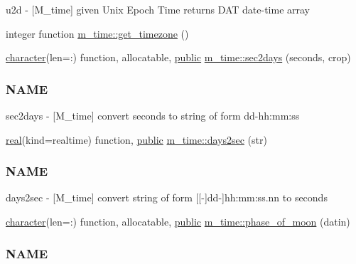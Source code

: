 \begin{DoxyCompactItemize}
\begin{DoxyCompactList}
u2d -\/ \mbox{[}M\+\_\+time\mbox{]} given Unix Epoch Time returns D\+AT date-\/time array \end{DoxyCompactList}\item 
integer function \hyperlink{namespacem__time_a7903410a1d28bcdf3d33ab0c2d74b124}{m\+\_\+time\+::get\+\_\+timezone} ()
\item 
\hyperlink{option__stopwatch_83_8txt_abd4b21fbbd175834027b5224bfe97e66}{character}(len=\+:) function, allocatable, \hyperlink{M__stopwatch_83_8txt_a2f74811300c361e53b430611a7d1769f}{public} \hyperlink{namespacem__time_a7788285d79b8d58323b05e9a30a2d992}{m\+\_\+time\+::sec2days} (seconds, crop)
\begin{DoxyCompactList}\small\item\em \subsubsection*{N\+A\+ME}

sec2days -\/ \mbox{[}M\+\_\+time\mbox{]} convert seconds to string of form dd-\/hh\+:mm\+:ss \end{DoxyCompactList}\item 
\hyperlink{read__watch_83_8txt_abdb62bde002f38ef75f810d3a905a823}{real}(kind=realtime) function, \hyperlink{M__stopwatch_83_8txt_a2f74811300c361e53b430611a7d1769f}{public} \hyperlink{namespacem__time_a99393c7906f1989f90ece03969224938}{m\+\_\+time\+::days2sec} (str)
\begin{DoxyCompactList}\small\item\em \subsubsection*{N\+A\+ME}

days2sec -\/ \mbox{[}M\+\_\+time\mbox{]} convert string of form \mbox{[}\mbox{[}-\/\mbox{]}dd-\/\mbox{]}hh\+:mm\+:ss.\+nn to seconds \end{DoxyCompactList}\item 
\hyperlink{option__stopwatch_83_8txt_abd4b21fbbd175834027b5224bfe97e66}{character}(len=\+:) function, allocatable, \hyperlink{M__stopwatch_83_8txt_a2f74811300c361e53b430611a7d1769f}{public} \hyperlink{namespacem__time_ab8a976e2f113cc38b6df80974cee55dc}{m\+\_\+time\+::phase\+\_\+of\+\_\+moon} (datin)
\begin{DoxyCompactList}\small\item\em \subsubsection*{N\+A\+ME}


\end{DoxyCompactList}
\end{DoxyCompactItemize}

